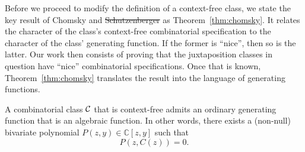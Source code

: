 \documentclass[12pt, a4paper, twoside]{report}
\providecommand{\DIFaddtex}[1]{{\protect\color{blue}\uwave{#1}}} %
\providecommand{\DIFdeltex}[1]{{\protect\color{red}\sout{#1}}}                      %
\providecommand{\DIFaddbegin}{} %
\providecommand{\DIFaddend}{} %
\providecommand{\DIFdelbegin}{} %
\providecommand{\DIFdelend}{} %
\providecommand{\DIFadd}[1]{\texorpdfstring{\DIFaddtex{#1}}{#1}} %
\providecommand{\DIFdel}[1]{\texorpdfstring{\DIFdeltex{#1}}{}} %
\begin{document}
Before we proceed to modify the definition of a context-free class, we state the key result of Chomsky and \DIFdelbegin \DIFdel{Schutzenberger }\DIFdelend \DIFaddbegin \DIFadd{Sch\"{u}tzenberger }\DIFaddend as Theorem~\ref{thm:chomsky}. It relates the character of the class's context-free combinatorial specification to the character of the class' generating function. If the former is ``nice'', then so is the latter. Our work then consists of proving that the juxtaposition classes in question have ``nice'' combinatorial specifications. Once that is known, Theorem~\ref{thm:chomsky} translates the result into the language of generating functions.

\DIFdelbegin %
\DIFdelend \DIFaddbegin \begin{theorem}
\DIFaddend \label{thm:chomsky}
A combinatorial class $\mathcal{C}$ that is context-free admits an ordinary generating function that is an algebraic function. In other words, there exists a (non-null) bivariate polynomial $P(z,y) \in \mathbb{C}[z,y]$ such that $$P(z,C(z)) = 0.$$
\end{theorem}
\end{document}
